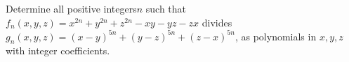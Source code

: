Determine all positive integers$ n$ such that $f_n(x,y,z) = x^{2n} + y^{2n} + z^{2n} - xy - yz - zx$ divides $g_n(x,y, z) = (x - y)^{5n} + (y -z)^{5n} + (z - x)^{5n}$, as polynomials in $x, y, z$ with integer coefficients.